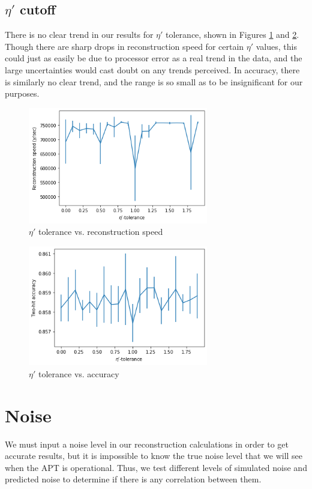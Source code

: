 \subsection{$\eta'$ cutoff}
There is no clear trend in our results for $\eta'$ tolerance, shown in Figures \ref{fig:eta_speed} and \ref{fig:eta_acc}. Though there are sharp drops in reconstruction speed for certain $\eta'$ values, this could just as easily be due to processor error as a real trend in the data, and the large uncertainties would cast doubt on any trends perceived. In accuracy, there is similarly no clear trend, and the range is so small as to be insignificant for our purposes.

\begin{figure}
    \centering
    \includegraphics[width=0.7\textwidth]{graphs/pi_eta_speed.png}
    \caption{$\eta'$ tolerance vs. reconstruction speed}
    \label{fig:eta_speed}
\end{figure}

\begin{figure}
    \centering
    \includegraphics[width=0.7\textwidth]{graphs/pi_eta_acc.png}
    \caption{$\eta'$ tolerance vs. accuracy}
    \label{fig:eta_acc}
\end{figure}

\section{Noise}
We must input a noise level in our reconstruction calculations in order to get accurate results, but it is impossible to know the true noise level that we will see when the APT is operational. Thus, we test different levels of simulated noise and predicted noise to determine if there is any correlation between them.

